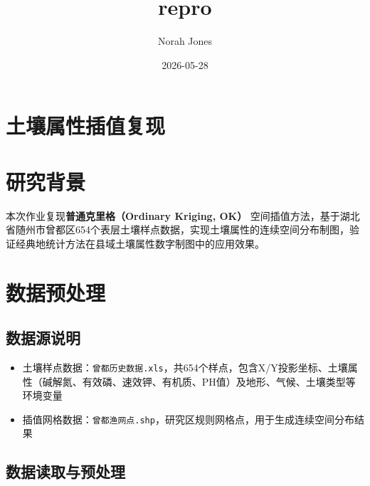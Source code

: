 \documentclass[
  letterpaper,
  DIV=11,
  numbers=noendperiod]{scrreprt}
\title{repro}
\author{Norah Jones}
\date{2026-05-28}
\providecommand{\tightlist}{%
  \setlength{\itemsep}{0pt}\setlength{\parskip}{0pt}}
\renewcommand*\contentsname{Table of contents}
\newcommand\contentsname{Table of contents}
\begin{document}
\maketitle

\renewcommand*\contentsname{Table of contents}
{
\setcounter{tocdepth}{2}
\tableofcontents
}


\chapter{土壤属性插值复现}\label{ux571fux58e4ux5c5eux6027ux63d2ux503cux590dux73b0}


\chapter{研究背景}\label{ux7814ux7a76ux80ccux666f}

本次作业复现\textbf{普通克里格（Ordinary Kriging, OK）}
空间插值方法，基于湖北省随州市曾都区654个表层土壤样点数据，实现土壤属性的连续空间分布制图，验证经典地统计方法在县域土壤属性数字制图中的应用效果。


\chapter{数据预处理}\label{ux6570ux636eux9884ux5904ux7406}

\section{数据源说明}\label{ux6570ux636eux6e90ux8bf4ux660e}

\begin{itemize}
\tightlist
\item
  土壤样点数据：\texttt{曾都历史数据.xls}，共654个样点，包含X/Y投影坐标、土壤属性（碱解氮、有效磷、速效钾、有机质、PH值）及地形、气候、土壤类型等环境变量
\item
  插值网格数据：\texttt{曾都渔网点.shp}，研究区规则网格点，用于生成连续空间分布结果
\end{itemize}

\section{数据读取与预处理}\label{ux6570ux636eux8bfbux53d6ux4e0eux9884ux5904ux7406}
\end{document}
